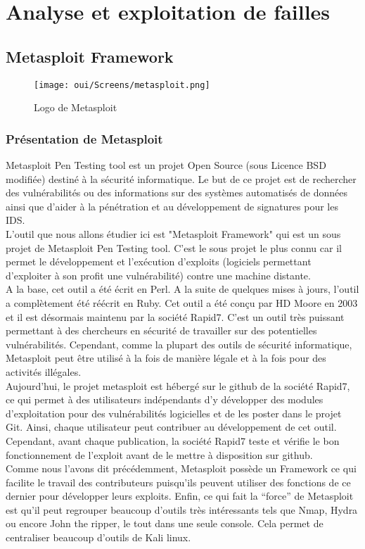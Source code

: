 \chapter{Analyse et exploitation de failles}
\label{chap:BDD}

\section{Metasploit Framework}
\begin{figure}[htp!]
  \centering
  \setlength\figureheight{7cm}
  \setlength\figurewidth{9cm}
  \texttt{[image: oui/Screens/metasploit.png]}
  \caption{Logo de Metasploit}
  \label{fig:courbe-tikz}
\end{figure}

\subsection{Présentation de Metasploit}
Metasploit Pen Testing tool est un projet Open Source (sous Licence BSD modifiée) destiné à la sécurité informatique. Le but de ce projet est de rechercher des vulnérabilités ou des informations sur des systèmes automatisés de données ainsi que d'aider à la pénétration et au développement de signatures pour les IDS.\\

L'outil que nous allons étudier ici est "Metasploit Framework" qui est un sous projet de
Metasploit Pen Testing tool. C'est le sous projet le plus connu car il permet le développement et l’exécution d’exploits (logiciels permettant d’exploiter à son profit une vulnérabilité) contre une machine distante.\\

A la base, cet outil a été écrit en Perl. A la suite de quelques mises à jours, l'outil a complètement été réécrit en Ruby. Cet outil a été conçu par HD Moore en 2003 et il est désormais maintenu par la société Rapid7. C'est un outil très puissant permettant à des chercheurs en sécurité de travailler sur des potentielles vulnérabilités. Cependant, comme la plupart des outils de sécurité informatique, Metasploit peut être utilisé à la fois de manière légale et à la fois pour des activités illégales.\\
Aujourd'hui, le projet metasploit est hébergé sur le github de la société Rapid7, ce qui permet à des utilisateurs indépendants d'y développer des modules d'exploitation pour des vulnérabilités logicielles et de les poster dans le projet Git. Ainsi, chaque utilisateur peut contribuer au développement de cet outil. Cependant, avant chaque publication, la société Rapid7 teste et vérifie le bon fonctionnement de l'exploit avant de le mettre à disposition sur github.\\
Comme nous l’avons dit précédemment, Metasploit possède un Framework ce qui facilite le travail des contributeurs puisqu’ils peuvent utiliser des fonctions de ce dernier pour développer leurs exploits. Enfin, ce qui fait la “force” de Metasploit est qu’il peut regrouper beaucoup d’outils très intéressants tels que Nmap, Hydra ou encore John the ripper, le tout dans une seule console. Cela permet de centraliser beaucoup d’outils de Kali linux.
